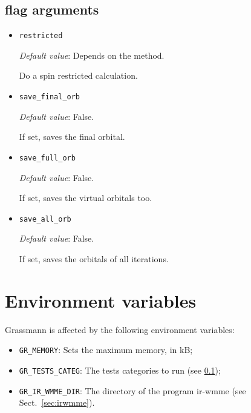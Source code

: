 \subsection{flag arguments}

\begin{itemize}
\item \verb+restricted+

  \emph{Default value}: Depends on the method.

  Do a spin restricted calculation.

\item \verb+save_final_orb+

  \emph{Default value}: False.

  If set, saves the final orbital.

\item \verb+save_full_orb+

  \emph{Default value}: False.

  If set, saves the virtual orbitals too.

\item \verb+save_all_orb+

  \emph{Default value}: False.

  If set, saves the orbitals of all iterations.

\end{itemize}


\section{Environment variables}
\label{sec:envvar}

Grassmann is affected by the following environment variables:
\begin{itemize}
\item \verb+GR_MEMORY+: Sets the maximum memory, in kB;
\item \verb+GR_TESTS_CATEG+: The tests categories to run (see \ref{});
\item \verb+GR_IR_WMME_DIR+: The directory of the program ir-wmme (see Sect.~\ref{sec:irwmme}).
\end{itemize}





